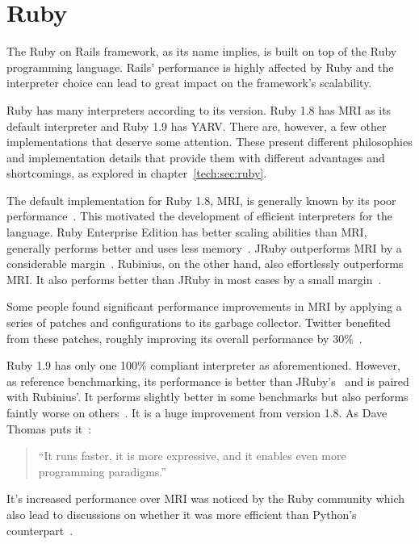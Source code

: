 \section{Ruby} %
\label{state:sec:ruby}
The Ruby on Rails framework, as its name implies, is built on top of the Ruby programming language. Rails' performance is highly affected by Ruby and the interpreter choice can lead to great impact on the framework's scalability.

Ruby has many interpreters according to its version. Ruby 1.8 has MRI as its default interpreter and Ruby 1.9 has YARV. There are, however, a few other implementations that deserve some attention. These present different philosophies and implementation details that provide them with different advantages and shortcomings, as explored in chapter~\ref{tech:sec:ruby}.

The default implementation for Ruby 1.8, MRI, is generally known by its poor performance~\cite{6tips_for_mri}. This motivated the development of efficient interpreters for the language. Ruby Enterprise Edition has better scaling abilities than MRI, generally performs better and uses less memory~\cite{ree_benchmarks}. JRuby outperforms MRI by a considerable margin~\cite{ruby19_performance}. Rubinius, on the other hand, also effortlessly outperforms MRI. It also performs better than JRuby in most cases by a small margin~\cite{rvm_rubinius_benchmarks}.

Some people found significant performance improvements in MRI by applying a series of patches and configurations to its garbage collector. Twitter benefited from these patches, roughly improving its overall performance by 30\%~\cite{ruby_gc_tuning}.

Ruby 1.9 has only one 100\% compliant interpreter as aforementioned. However, as reference benchmarking, its performance is better than JRuby's~\cite{ruby19_performance} and is paired with Rubinius'. It performs slightly better in some benchmarks but also performs faintly worse on others~\cite{rvm_rubinius_benchmarks,ruby_interpreter_benchmarks}. It is a huge improvement from version 1.8. As Dave Thomas puts it~\cite{programming_ruby_19}:
\begin{quote}
  ``It runs faster, it is more expressive, and it enables even more programming paradigms.''
\end{quote}
It's increased performance over MRI was noticed by the Ruby community which also lead to discussions on whether it was more efficient than Python's counterpart~\cite{ruby19_python}.

